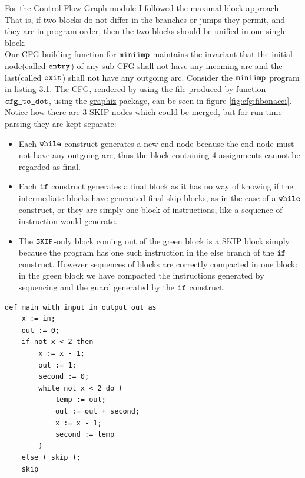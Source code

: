 \documentclass[a4paper,11pt]{report}
\begin{document}
For the Control-Flow Graph module I followed the maximal block approach. That is, if two blocks do not differ in the branches or jumps they permit, and they are in program order, then the two blocks should be unified in one single block.
\\
Our CFG-building function for $\verb|miniimp|$ maintains the invariant that the initial node(called $\verb|entry|$) of any sub-CFG shall not have any incoming arc and the last(called $\verb|exit|$) shall not have any outgoing arc.
Consider the $\verb|miniimp|$ program in listing 3.1. The CFG, rendered by using the file produced by function $\verb|cfg_to_dot|$, using the \href{https://graphviz.org/download/}{graphiz} package, can be seen in figure \ref{fig:cfg:fibonacci}.
Notice how there are 3 SKIP nodes which could be merged, but for run-time parsing they are kept separate:
\begin{itemize}
  \item Each $\verb|while|$ construct generates a new end node because the end node must not have any outgoing arc, thus the block containing 4 assignments cannot be regarded as final.
  \item Each $\verb|if|$ construct generates a final block as it has no way of knowing if the intermediate blocks have generated final skip blocks, as in the case of a $\verb|while|$ construct, or they are simply one block of instructions, like a sequence of instruction would generate.
  \item The $\verb|SKIP|$-only block coming out of the green block is a SKIP block simply because the program has one such instruction in the else branch of the $\verb|if|$ construct.
However sequences of blocks are correctly compacted in one block: in the green block we have compacted the instructions generated by sequencing and the guard generated by the $\verb|if|$ construct.
\end{itemize}
\newpage

\begin{lstlisting}[caption={Fibonacci in miniimp}]
def main with input in output out as
    x := in;
    out := 0;
    if not x < 2 then 
        x := x - 1;
        out := 1;
        second := 0;
        while not x < 2 do (
            temp := out;
            out := out + second;
            x := x - 1;
            second := temp
        )
    else ( skip );
    skip
\end{lstlisting}
\end{document}
